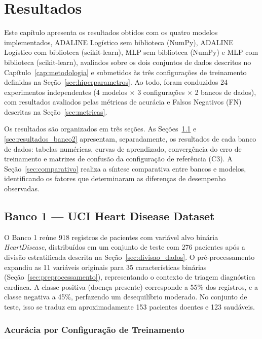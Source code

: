 \chapter{Resultados}
\label{cap:resultados}

Este capítulo apresenta os resultados obtidos com os quatro modelos implementados, ADALINE Logístico sem biblioteca (NumPy), ADALINE Logístico com biblioteca (scikit-learn), MLP sem biblioteca (NumPy) e MLP com biblioteca (scikit-learn), avaliados sobre os dois conjuntos de dados descritos no Capítulo~\ref{cap:metodologia} e submetidos às três configurações de treinamento definidas na Seção~\ref{sec:hiperparametros}. Ao todo, foram conduzidos 24 experimentos independentes (4 modelos $\times$ 3 configurações $\times$ 2 bancos de dados), com resultados avaliados pelas métricas de acurácia e Falsos Negativos (FN) descritas na Seção~\ref{sec:metricas}.

Os resultados são organizados em três seções. As Seções~\ref{sec:resultados_banco1} e \ref{sec:resultados_banco2} apresentam, separadamente, os resultados de cada banco de dados: tabelas numéricas, curvas de aprendizado, convergência do erro de treinamento e matrizes de confusão da configuração de referência (C3). A Seção~\ref{sec:comparativo} realiza a síntese comparativa entre bancos e modelos, identificando os fatores que determinaram as diferenças de desempenho observadas.

\section{Banco 1 --- UCI Heart Disease Dataset}
\label{sec:resultados_banco1}

O Banco 1 reúne 918 registros de pacientes com variável alvo binária \textit{HeartDisease}, distribuídos em um conjunto de teste com 276 pacientes após a divisão estratificada descrita na Seção~\ref{sec:divisao_dados}. O pré-processamento expandiu as 11 variáveis originais para 35 características binárias (Seção~\ref{sec:preprocessamento}), representando o contexto de triagem diagnóstica cardíaca. A classe positiva (doença presente) corresponde a 55\% dos registros, e a classe negativa a 45\%, perfazendo um desequilíbrio moderado. No conjunto de teste, isso se traduz em aproximadamente 153 pacientes doentes e 123 saudáveis.

\subsection{Acurácia por Configuração de Treinamento}
\label{sec:banco1_acuracia}

